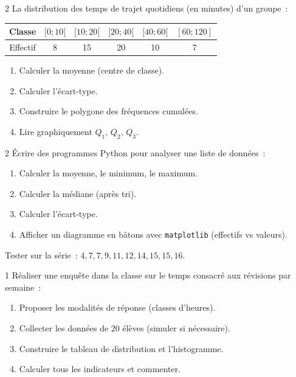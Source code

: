 \begin{probleme}{2}
La distribution des temps de trajet quotidiens (en minutes) d'un groupe~:
\begin{center}
\begin{tabular}{|c|c|c|c|c|c|}
\hline
\rowcolor{BN!10}
Classe & $[0;10[$ & $[10;20[$ & $[20;40[$ & $[40;60[$ & $[60;120]$ \\
\hline
Effectif & 8 & 15 & 20 & 10 & 7 \\
\hline
\end{tabular}
\end{center}
\begin{enumerate}
  \item Calculer la moyenne (centre de classe).
  \item Calculer l'\'ecart-type.
  \item Construire le polygone des fr\'equences cumul\'ees.
  \item Lire graphiquement $Q_1$, $Q_2$, $Q_3$.
\end{enumerate}
\end{probleme}

\begin{probleme}{2}
\'Ecrire des programmes Python pour analyser une liste de donn\'ees~:
\begin{enumerate}
  \item Calculer la moyenne, le minimum, le maximum.
  \item Calculer la m\'ediane (apr\`es tri).
  \item Calculer l'\'ecart-type.
  \item Afficher un diagramme en b\^atons avec \texttt{matplotlib}
        (effectifs vs valeurs).
\end{enumerate}
Tester sur la s\'erie~: $4, 7, 7, 9, 11, 12, 14, 15, 15, 16$.
\end{probleme}

\begin{probleme}{1}
R\'ealiser une enquête dans la classe sur le temps consacr\'e aux r\'evisions
par semaine~:
\begin{enumerate}
  \item Proposer les modalit\'es de r\'eponse (classes d'heures).
  \item Collecter les donn\'ees de $20$ \'el\`eves (simuler si n\'ecessaire).
  \item Construire le tableau de distribution et l'histogramme.
  \item Calculer tous les indicateurs et commenter.
\end{enumerate}
\end{probleme}

